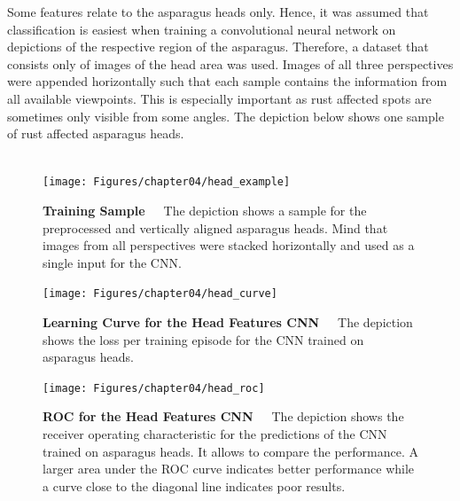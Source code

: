 Some features relate to the asparagus heads only. Hence, it was assumed that classification is easiest when training a convolutional neural network on depictions of the respective region of the asparagus. Therefore, a dataset that consists only of images of the head area was used. Images of all three perspectives were appended horizontally such that each sample contains the information from all available viewpoints. This is especially important as rust affected spots are sometimes only visible from some angles. The depiction below shows one sample of rust affected asparagus heads. \\
\\
\begin{figure}[h]
	\centering
	\texttt{[image: Figures/chapter04/head\_example]}
	\decoRule
	\caption[Training Sample of Preprocessed and Aligned Asparagus Heads]{\textbf{Training Sample}~~~The depiction shows a sample for the preprocessed and vertically aligned asparagus heads. Mind that images from all perspectives were stacked horizontally and used as a single input for the CNN.}
	\label{fig:HeadExample}
\end{figure}

\begin{table}[h]
	\centering
	\caption[??]{\textbf{??}~~~??}
	\label{tab:}
\end{table}

\begin{figure}[H]
	\centering
	\texttt{[image: Figures/chapter04/head\_curve]}
	\decoRule
	\caption[Learning Curve for the Head Features CNN]{\textbf{Learning Curve for the Head Features CNN}~~~The depiction shows the loss per training episode for the CNN trained on asparagus heads.}
	\label{fig:HeadCurve}
	\centering
	\vspace{2cm}
	\texttt{[image: Figures/chapter04/head\_roc]}
	\decoRule
	\caption[ROC for the Head Features CNN]{\textbf{ROC for the Head Features CNN}~~~The depiction shows the receiver operating characteristic for the predictions of the CNN trained on asparagus heads. It allows to compare the performance. A larger area under the ROC curve indicates better performance while a curve close to the diagonal line indicates poor results.}
	\label{fig:HeadROC}
\end{figure}


